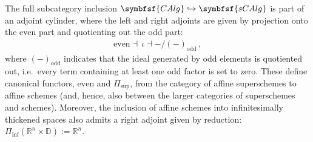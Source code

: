     \begin{property}[Cohesion]
        The full subcategory inclusion $\symbfsf{CAlg}\hookrightarrow\symbfsf{sCAlg}$ is part of an adjoint cylinder, where the left and right adjoints are given by projection onto the even part and quotienting out the odd part:
        \begin{gather}
            \mathrm{even}\dashv\,\iota\dashv-/(-)_{\text{odd}}\,,
        \end{gather}
        where $(-)_{\text{odd}}$ indicates that the ideal generated by odd elements is quotiented out, i.e.~every term containing at least one odd factor is set to zero. These define canonical functors, $\mathrm{even}$ and $\Pi_{\text{sup}}$, from the category of affine superschemes to affine schemes (and, hence, also between the larger categories of superschemes and schemes). Moreover, the inclusion of affine schemes into infinitesimally thickened spaces also admits a right adjoint given by reduction: $\Pi_{\text{inf}}(\mathbb{R}^n\times\mathbb{D}):=\mathbb{R}^n$.


\end{property}
